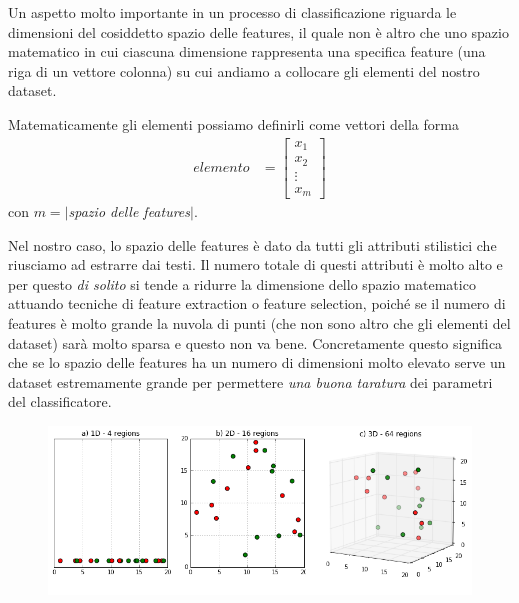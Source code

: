 \documentclass[titlepage]{article}
\begin{document}
Un aspetto molto importante in un processo di classificazione riguarda le dimensioni del cosiddetto spazio delle features, il quale non è altro che uno spazio matematico in cui ciascuna dimensione rappresenta una specifica feature (una riga di un vettore colonna) su cui andiamo a collocare gli elementi del nostro dataset.

\noindent
Matematicamente gli elementi possiamo definirli come vettori della forma
\begin{align}
    elemento &= \begin{bmatrix}
        x_{1} \\
        x_{2} \\
        \vdots \\
        x_{m}
        \end{bmatrix}
  \end{align}
con $m=|$\textit{spazio delle features}$|$.

Nel nostro caso, lo spazio delle features è dato da tutti gli attributi stilistici che riusciamo ad estrarre dai testi. Il numero totale di questi attributi è molto alto e per questo \emph{di solito} si tende a ridurre la dimensione dello spazio matematico attuando tecniche di feature extraction o feature selection, poiché se il numero di features è molto grande la nuvola di punti (che non sono altro che gli elementi del dataset) sarà molto sparsa e questo non va bene. Concretamente questo significa che se lo spazio delle features ha un numero di dimensioni molto elevato serve un dataset estremamente grande per permettere \emph{una buona taratura} dei parametri del classificatore.
\begin{figure}[htp]
	\centering
	\includegraphics[width=\textwidth, height=\textheight, keepaspectratio]{curse-of-dimensionality.png}
\end{figure}
\end{document}
